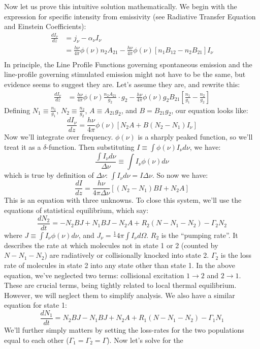 \documentclass{article}
\def\ato{{A_{21}}}
\def\bto{{B_{21}}}
\def\bot{{B_{12}}}
\def\inv#1{\frac1{#1}}
\def\inv#1{{\frac{1}{}#1}}
\def\ato{{A_{21}}}
\def\bto{{B_{21}}}
\def\bot{{B_{12}}}
\def\ato{{A_{21}}}
\def\bto{{B_{21}}}
\def\bot{{B_{12}}}
\begin{document}
Now let us prove this intuitive solution mathematically.
  We begin with the expression for specific intensity from
emissivity (see Radiative Transfer Equation and Einstein Coefficients):
$$\begin{aligned}\frac{dI_\nu}{ dz}&=j_\nu-\alpha_\nu I_\nu\\ 
&=\frac{h\nu}{4\pi}\phi(\nu)n_2A_{21}-\frac{h\nu}{4\pi}
\phi(\nu)[n_1\bot-n_2\bto]I_\nu\\ \end{aligned}$$
In principle, the Line Profile Functions governing spontaneous emission and the
line-profile governing stimulated emission might not have to be the same, but
evidence seems to suggest they are.  Let's assume they are, and rewrite this:
$$\begin{aligned}\frac{dI_\nu}{ dz}&=\frac{h\nu}{4\pi}\phi(\nu)\frac{n_2\ato}{ g_2}\cdot g_2
-\frac{h\nu}{4\pi}\phi(\nu)g_2\bto\left[\frac{n_1}{ g_1}-\frac{n_2}{ g_2}\right]
\end{aligned}$$
Defining $N_1\equiv\frac{n_1}{ g_1}$, $N_2\equiv\frac{n_2}{ g_2}$, $A\equiv
\ato g_2$, and $B=\bto g_2$, our equation looks like:
$$\frac{dI_\nu}{ dz}=\frac{h\nu}{4\pi}\phi(\nu)[N_2A+B(N_2-N_1)I_\nu]$$
Now we'll integrate over frequency.  $\phi(\nu)$ is a sharply peaked function,
so we'll treat it as a $\delta$-function.  Then substituting
$I\equiv\int{\phi(\nu)I_\nu d\nu}$, we have:
$$\frac{\int{I_\nu d\nu}}{\Delta\nu}\equiv\int{I_\nu\phi(\nu)d\nu}$$
which is true by definition of $\Delta\nu$: $\int{I_\nu d\nu}=I\Delta\nu$.
So now we have:
$$\frac{dI}{ dz}=\frac{h\nu}{4\pi\Delta\nu}[(N_2-N_1)BI+N_2A]$$
This is an equation with three unknowns.  To close this system, we'll use the
equations of statistical equilibrium, which say:
$$\frac{dN_2}{ dt}=-N_2BJ+N_1BJ-N_2A+R_2(N-N_1-N_2)-\Gamma_2N_2$$
where $J\equiv\int{I_\nu\phi(\nu)d\nu}$, and $J_\nu=\inv{4\pi}\int{I_\nu
d\Omega}$.  $R_2$ is the ``pumping rate''.  It describes the rate at which
molecules not in state 1 or 2 (counted by $N-N_1-N_2$) are radiatively or 
collisionally
knocked into state 2. $\Gamma_2$ is the loss rate of molecules in state 2 into
any state other than state 1.  In the above equation, we've neglected two
terms: collisional excitation $1\to2$ and $2\to1$.  These are crucial terms,
being tightly related to local thermal equilibrium.  However, we will neglect
them to simplify analysis.  We also have a similar equation for state 1:
$$\frac{dN_1}{ dt}=N_2BJ-N_1BJ+N_2A+R_1(N-N_1-N_2)-\Gamma_1N_1$$
We'll further simply matters by setting the loss-rates for the two populations
equal to each other ($\Gamma_1=\Gamma_2=\Gamma$).  Now let's solve for the 
\end{document}
